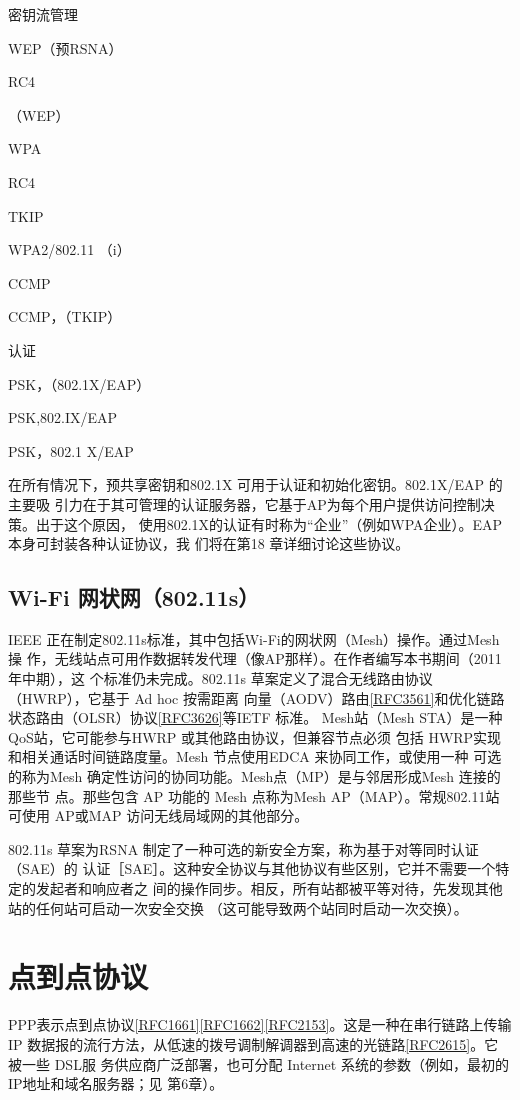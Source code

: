 密钥流管理

WEP（预RSNA）

RC4

（WEP）

WPA

RC4

TKIP

WPA2/802.11 （i）

CCMP

CCMP，（TKIP）

认证

PSK，（802.1X/EAP）

PSK,802.IX/EAP

PSK，802.1 X/EAP

在所有情况下，预共享密钥和802.1X 可用于认证和初始化密钥。802.1X/EAP 的主要吸
引力在于其可管理的认证服务器，它基于AP为每个用户提供访问控制决策。出于这个原因，
使用802.1X的认证有时称为“企业”（例如WPA企业）。EAP本身可封装各种认证协议，我
们将在第18 章详细讨论这些协议。

\subsection{Wi-Fi 网状网（802.11s）}

IEEE 正在制定802.11s标准，其中包括Wi-Fi的网状网（Mesh）操作。通过Mesh 操
作，无线站点可用作数据转发代理（像AP那样）。在作者编写本书期间（2011年中期），这
个标准仍未完成。802.11s 草案定义了混合无线路由协议（HWRP），它基于 Ad hoc 按需距离
向量（AODV）路由\href{https://www.rfc-editor.org/rfc/rfc3561}{[RFC3561]}和优化链路状态路由（OLSR）协议\href{https://www.rfc-editor.org/rfc/rfc3626}{[RFC3626]}等IETF 标准。
Mesh站（Mesh STA）是一种QoS站，它可能参与HWRP 或其他路由协议，但兼容节点必须
包括 HWRP实现和相关通话时间链路度量。Mesh 节点使用EDCA 来协同工作，或使用一种
可选的称为Mesh 确定性访问的协同功能。Mesh点（MP）是与邻居形成Mesh 连接的那些节
点。那些包含 AP 功能的 Mesh 点称为Mesh AP（MAP）。常规802.11站可使用 AP或MAP
访问无线局域网的其他部分。

802.11s 草案为RSNA 制定了一种可选的新安全方案，称为基于对等同时认证（SAE）的
认证［SAE］。这种安全协议与其他协议有些区别，它并不需要一个特定的发起者和响应者之
间的操作同步。相反，所有站都被平等对待，先发现其他站的任何站可启动一次安全交换
（这可能导致两个站同时启动一次交换）。

\section{点到点协议}

PPP表示点到点协议\href{https://www.rfc-editor.org/rfc/rfc1661}{[RFC1661]}\href{https://www.rfc-editor.org/rfc/rfc1662}{[RFC1662]}\href{https://www.rfc-editor.org/rfc/rfc2153}{[RFC2153]}。这是一种在串行链路上传输IP
数据报的流行方法，从低速的拨号调制解调器到高速的光链路\href{https://www.rfc-editor.org/rfc/rfc2615}{[RFC2615]}。它被一些 DSL服
务供应商广泛部署，也可分配 Internet 系统的参数（例如，最初的IP地址和域名服务器；见
第6章）。


